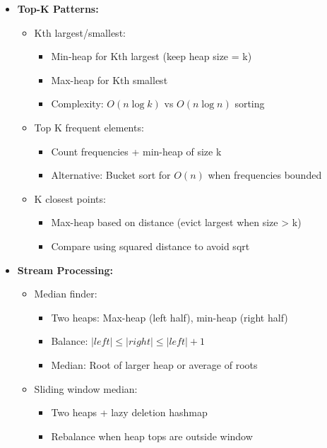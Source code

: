 \documentclass[a4paper,10pt]{book}
\begin{document}
\begin{itemize}
    \item \textbf{Top-K Patterns:}
    \begin{itemize}
        \item Kth largest/smallest:
        \begin{itemize}
            \item Min-heap for Kth largest (keep heap size = k)
            \item Max-heap for Kth smallest
            \item Complexity: $O(n \log k)$ vs $O(n \log n)$ sorting
        \end{itemize}
        \item Top K frequent elements:
        \begin{itemize}
            \item Count frequencies + min-heap of size k
            \item Alternative: Bucket sort for $O(n)$ when frequencies bounded
        \end{itemize}
        \item K closest points:
        \begin{itemize}
            \item Max-heap based on distance (evict largest when size > k)
            \item Compare using squared distance to avoid sqrt
        \end{itemize}
    \end{itemize}
    
    \item \textbf{Stream Processing:}
    \begin{itemize}
        \item Median finder:
        \begin{itemize}
            \item Two heaps: Max-heap (left half), min-heap (right half)
            \item Balance: $|left| \leq |right| \leq |left| + 1$
            \item Median: Root of larger heap or average of roots
        \end{itemize}
        \item Sliding window median:
        \begin{itemize}
            \item Two heaps + lazy deletion hashmap
            \item Rebalance when heap tops are outside window
        \end{itemize}
    \end{itemize}
    

\end{itemize}
\end{document}
